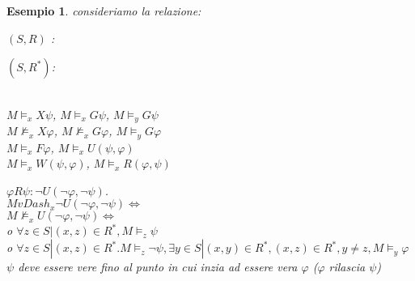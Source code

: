 \documentclass[a4paper,12pt]{article}
\theoremstyle{def}
\theoremstyle{prop}
\theoremstyle{esempio}
\newtheorem*{example}{Esempio}
\theoremstyle{dimostrazione}
\theoremstyle{teo}
\theoremstyle{osservazione}
\begin{document}
\newpage
\begin{example}
	consideriamo la relazione:
	\begin{center}
		\((S,R)\) :
		\((S,R^*)\):
		\\
		\(M \vDash_x X \psi\), \(M \vDash_x G \psi\), \(M \vDash_y G \psi\)\\
		\(M \nvDash_x X \varphi\), \(M \nvDash_x G \varphi\), \(M \vDash_y G \varphi\)\\
		\(M \vDash_x F \varphi\), \(M \vDash_x U(\psi, \varphi)\)\\
		\(M \vDash_x W(\psi, \varphi)\), \(M \vDash_x R(\varphi, \psi)\)
	\end{center}
	\(\varphi R \psi : \neg U(\neg \varphi, \neg \psi)\).\\
	\(M vDash_x \neg U(\neg \varphi, \neg \psi) \iff \)\\
	\(M \nvDash_x U(\neg \varphi, \neg \psi) \iff \)\\
	o \(\forall z \in S | (x,z) \in R^*, M \vDash_z \psi\)\\
	o \(\forall z \in S | (x,z) \in R^*. M \vDash_z \neg \psi, \exists y \in S | (x,y) \in R^*, (x,z) \in R^*, y \neq z, M \vDash_y \varphi\)\\
	\(\psi\) deve essere vere fino al punto in cui inzia ad essere vera \(\varphi\) (\(\varphi\) rilascia \(\psi\))
\end{example}
\newpage
\end{document}
